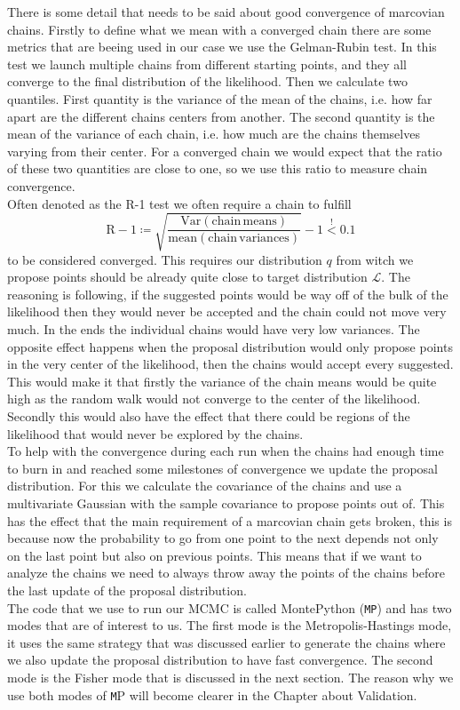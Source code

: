 \documentclass[oneside]{book}
\newcommand*{\montepython}{\texttt MP\xspace}
\begin{document}
There is some detail that needs to be said about good convergence of marcovian chains. Firstly to define what we mean with a converged chain there are some metrics that are beeing used in our case we use the Gelman-Rubin test. In this test we launch multiple chains from different starting points, and they all converge to the final distribution of the likelihood. Then we calculate two quantiles. First quantity is the variance of the mean of the chains, i.e. how far apart are the different chains centers from another. The second quantity is the mean of the variance of each chain, i.e. how much are the chains themselves varying from their center. For a converged chain we would expect that the ratio of these two quantities are close to one, so we use this ratio to measure chain convergence.\\
Often denoted as the R-1 test we often require a chain to fulfill 
\begin{equation}
 \mathrm{R}-1 \coloneqq \sqrt{\frac{\mathrm{Var(chain\,means)}}{\mathrm{mean(chain\,variances)}}} -1 \overset{!}{<} 0.1
\end{equation}
to be considered converged. This requires our distribution $q$ from witch we propose points should be already quite close to target distribution $\mathcal{L}$. The reasoning is following, if the suggested points would be way off of the bulk of the likelihood then they would never be accepted and the chain could not move very much. In the ends the individual chains would have very low variances. The opposite effect happens when the proposal distribution would only propose points in the very center of the likelihood, then the chains would accept every suggested. This would make it that firstly the variance of the chain means would be quite high as the random walk would not converge to the center of the likelihood. Secondly this would also have the effect that there could be regions of the likelihood that would never be explored by the chains.\\
To help with the convergence during each run when the chains had enough time to burn in and reached some milestones of convergence we update the proposal distribution. For this we calculate the covariance of the chains and use a multivariate Gaussian with the sample covariance to propose points out of. This has the effect that the main requirement of a marcovian chain gets broken, this is because now the probability to go from one point to the next depends not only on the last point but also on previous points. This means that if we want to analyze the chains we need to always throw away the points of the chains before the last update of the proposal distribution.\\
The code that we use to run our MCMC is called MontePython ({\tt MP}) and has two modes that are of interest to us. The first mode is the Metropolis-Hastings mode, it uses the same strategy that was discussed earlier to generate the chains where we also update the proposal distribution to have fast convergence. The second mode is the Fisher mode that is discussed in the next section. The reason why we use both modes of \montepython will become clearer in the Chapter about Validation.  
\end{document}
